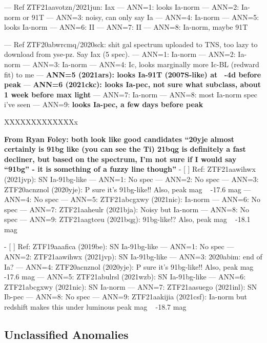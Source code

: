 \documentclass[twocolumn]{aastex63}
\begin{document}
	— Ref ZTF21aavotzn/2021jun: Iax
	— ANN=1: looks Ia-norm
	— ANN=2: Ia-norm or 91T
	— ANN=3: noisy, can only say Ia
	— ANN=4: Ia-norm
	— ANN=5: looks Ia-norm
	— ANN=6: II
	— ANN=7: II
	— ANN=8: Ia-norm, maybe 91T

	— Ref ZTF20abwrcmq/2020sck: shit gal spectrum uploaded to TNS, too lazy to download from yse-pz. Say Iax (5 spec).
	— ANN=1: Ia-norm
	— ANN=2: Ia-norm
	— ANN=3: Ia-norm
	— ANN=4: Ic, looks marginally more Ic-BL (redward fit) to me
	— \textbf{ANN=5 (2021ars): looks Ia-91T (2007S-like) at ~-4d before peak}
	— \textbf{ANN=6 (2021ckc): looks Ia-pec, not sure what subclass, about 1 week before max light}
	— ANN=7: Ia-norm
	— ANN=8: most Ia-norm spec i’ve seen
	— ANN=9: \textbf{looks Ia-pec, a few days before peak}


 XXXXXXXXXXXXXx

 \textbf{From Ryan Foley:
both look like good candidates
“20yje almost certainly is 91bg like (you can see the Ti)
21bqg is definitely a fast decliner, but based on the spectrum, I’m not sure if I would say “91bg” - it is something of a fuzzy line though”
}
- [ ] Ref: ZTF21aawihwx (2021jvp): SN Ia-91bg-like
	— ANN=1: No spec
	— ANN=2: No spec
	— ANN=3: ZTF20acnznol (2020yje): P sure it’s 91bg-like!! Also, peak mag ~ -17.6 mag
	— ANN=4: No spec
	— ANN=5: ZTF21abcgxwy (2021nic): Ia-norm
	— ANN=6: No spec
	— ANN=7: ZTF21aaheulr (2021bja): Noisy but Ia-norm
	— ANN=8: No spec
	— ANN=9: ZTF21aagtceu (2021bqg): 91bg-like!? Also, peak mag ~ -18.1 mag



- [ ] Ref: ZTF19aaafica (2019be): SN Ia-91bg-like
	— ANN=1: No spec
	— ANN=2: ZTF21aawihwx (2021jvp): SN Ia-91bg-like
	— ANN=3: 2020abim: end of Ia?
	— ANN=4: ZTF20acnznol (2020yje): P sure it’s 91bg-like!! Also, peak mag ~ -17.6 mag
	— ANN=5: ZTF21abulrsl (2021wzb): SN Ia-91bg-like
	— ANN=6: ZTF21abcgxwy (2021nic): SN Ia-norm
	— ANN=7: ZTF21aasuego (2021inl): SN Ib-pec
	— ANN=8: No spec
	— ANN=9: ZTF21aakijia (2021csf): Ia-norm but redshift makes this under luminous peak mag ~ -18.7 mag


\subsection{Unclassified Anomalies}  \label{subsec:unclass_anom}
\end{document}
